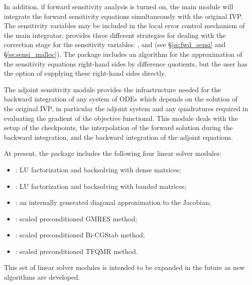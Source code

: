 In addition, if forward sensitivity analysis is turned on, the main module 
will integrate the forward sensitivity equations simultaneously with the original
IVP. The sensitivity variables may be included in the local error control
mechanism of the main integrator.
{\cvodes} provides three different strategies for dealing with the correction
stage for the sensitivity variables: ,  and
 (see \S\ref{ss:fwd_sensi} and \S\ref{ss:sensi_malloc}).
The {\cvodes} package includes an algorithm for the approximation of the
sensitivity equations right-hand sides by difference quotients, but the user has
the option of supplying these right-hand sides directly.

The adjoint sensitivity module provides the infrastructure needed for the 
backward integration of any system of ODEs which depends on the solution 
of the original IVP, in particular the adjoint system and any quadratures required
in evaluating the gradient of the objective functional.  This module deals with
the setup of the checkpoints, the interpolation of the forward solution during
the backward integration, and the backward integration of the adjoint equations.


At present, the package includes the following four {\cvodes} linear solver
modules:
\begin{itemize} 
\item {\cvdense}: LU factorization and backsolving with dense matrices; 
\item {\cvband}: LU factorization and backsolving with banded matrices; 
\item {\cvdiag}: an internally generated diagonal approximation to the 
Jacobian; 
\item {\cvspgmr}: scaled preconditioned GMRES method;
\item {\cvspbcg}: scaled preconditioned Bi-CGStab method;
\item {\cvsptfqmr}: scaled preconditioned TFQMR method.
\end{itemize}
This set of linear solver modules is intended to be expanded in the
future as new algorithms are developed.

